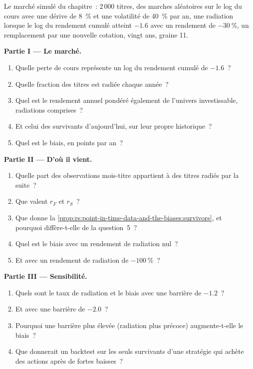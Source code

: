 \begin{problem}\label{pb:rs:point-in-time-data-and-the-biases:1}
Le marché simulé du chapitre~: 2\,000 titres, des marches aléatoires sur le log du cours avec une dérive de 8~\% et une volatilité de 40~\% par an, une radiation
lorsque le log du rendement cumulé atteint $-1.6$ avec un rendement de $-30~\%$, un remplacement par une nouvelle cotation, vingt ans, graine 11.

\medskip\noindent\textbf{Partie I --- Le marché.}
\begin{enumerate}
\item Quelle perte de cours représente un log du rendement cumulé de $-1.6$~?
\item Quelle fraction des titres est radiée chaque année~?
\item Quel est le rendement annuel pondéré également de l'univers investissable, radiations comprises~?
\item Et celui des survivants d'aujourd'hui, sur leur propre historique~?
\item Quel est le biais, en points par an~?
\end{enumerate}

\medskip\noindent\textbf{Partie II --- D'où il vient.}
\begin{enumerate}[resume]
\item Quelle part des observations mois-titre appartient à des titres radiés par la suite~?
\item Que valent $r_F$ et $r_S$~?
\item Que donne la \cref{prop:rs:point-in-time-data-and-the-biases:survivors}, et pourquoi diffère-t-elle de la question~5~?
\item Quel est le biais avec un rendement de radiation nul~?
\item Et avec un rendement de radiation de $-100~\%$~?
\end{enumerate}

\medskip\noindent\textbf{Partie III --- Sensibilité.}
\begin{enumerate}[resume]
\item Quels sont le taux de radiation et le biais avec une barrière de $-1.2$~?
\item Et avec une barrière de $-2.0$~?
\item Pourquoi une barrière plus élevée (radiation plus précoce) augmente-t-elle le biais~?
\item Que donnerait un backtest sur les seuls survivants d'une stratégie qui achète des actions après de fortes baisses~?
\end{enumerate}


\end{problem}
